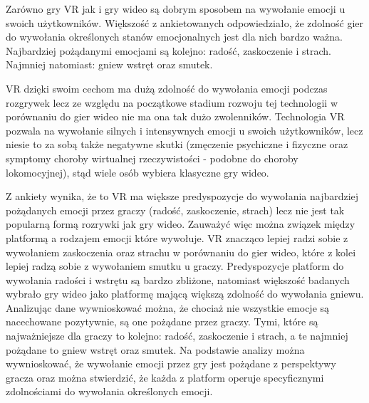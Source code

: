 
Zarówno gry VR jak i gry wideo są dobrym sposobem na wywołanie emocji u swoich użytkowników. Większość z ankietowanych odpowiedziało, że zdolność gier do wywołania określonych stanów emocjonalnych jest dla nich bardzo ważna. Najbardziej pożądanymi emocjami są kolejno: radość, zaskoczenie i strach. Najmniej natomiast: gniew wstręt oraz smutek. 

VR dzięki swoim cechom ma dużą zdolność do wywołania emocji podczas rozgrywek lecz ze względu na początkowe stadium rozwoju tej technologii w porównaniu do gier wideo nie ma ona tak dużo zwolenników. Technologia VR pozwala na wywołanie silnych i intensywnych emocji u swoich
użytkowników, lecz niesie to za sobą także negatywne skutki (zmęczenie psychiczne i fizyczne oraz symptomy choroby wirtualnej rzeczywistości - podobne do choroby lokomocyjnej), stąd wiele osób wybiera klasyczne gry wideo.

Z ankiety wynika, że to VR ma większe predyspozycje do wywołania najbardziej pożądanych emocji przez graczy (radość, zaskoczenie, strach) lecz nie jest tak popularną formą rozrywki jak gry wideo. Zauważyć więc można związek między platformą a rodzajem emocji które wywołuje. VR znacząco lepiej radzi sobie z wywołaniem zaskoczenia oraz strachu w porównaniu do gier wideo, które z kolei lepiej radzą sobie z wywołaniem smutku u graczy. Predyspozycje platform do wywołania radości i wstrętu są bardzo zbliżone, natomiast większość badanych wybrało gry wideo jako platformę mającą większą zdolność do wywołania gniewu. Analizując dane wywnioskować można, że chociaż nie wszystkie emocje są nacechowane pozytywnie, są one pożądane przez graczy. Tymi, które są najważniejsze dla graczy to kolejno: radość, zaskoczenie i strach, a te najmniej pożądane to gniew wstręt oraz smutek. Na podstawie analizy można wywnioskować, że wywołanie emocji przez gry jest pożądane z perspektywy gracza oraz można stwierdzić, że każda z platform operuje specyficznymi zdolnościami do wywołania określonych emocji. 




